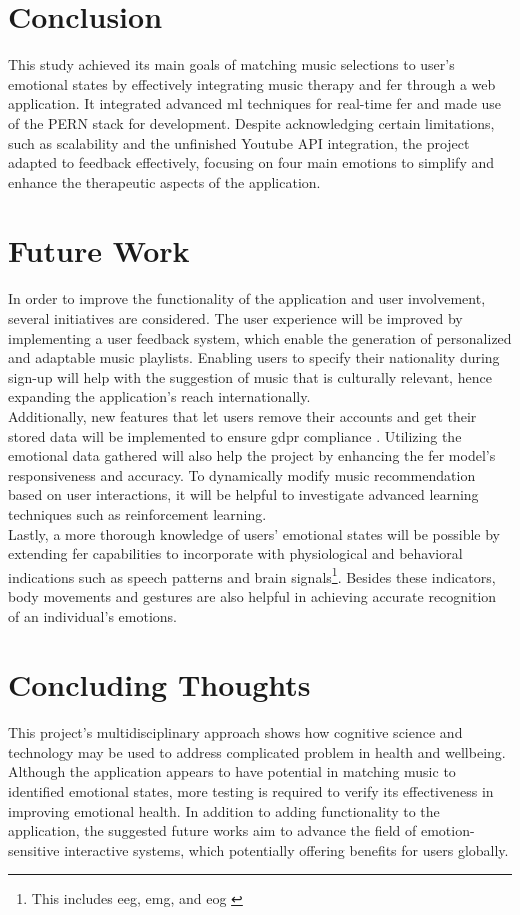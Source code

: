 \section{Conclusion}
This study achieved its main goals of matching music selections to user's emotional states by effectively integrating music therapy and \gls{fer} through a web application.
It integrated advanced \gls{ml} techniques for real-time \gls{fer} and made use of the PERN stack for development.
Despite acknowledging certain limitations, such as scalability and the unfinished Youtube API integration, the project adapted to feedback effectively, focusing on four main emotions to simplify and enhance the therapeutic aspects of the application.
\\
\section{Future Work}
In order to improve the functionality of the application and user involvement, several initiatives are considered.
The user experience will be improved by implementing a user feedback system, which enable the generation of personalized and adaptable music playlists.
Enabling users to specify their nationality during sign-up will help with the suggestion of music that is culturally relevant, hence expanding the application's reach internationally.
\\
\indent Additionally, new features that let users remove their accounts and get their stored data will be implemented to ensure \gls{gdpr} compliance \citep{gdpr_2018_general}.
Utilizing the emotional data gathered will also help the project by enhancing the \gls{fer} model's responsiveness and accuracy.
To dynamically modify music recommendation based on user interactions, it will be helpful to investigate advanced learning techniques such as reinforcement learning.
\\
\indent Lastly, a more thorough knowledge of users' emotional states will be possible by extending \gls{fer} capabilities to incorporate with physiological and behavioral indications such as speech patterns and brain signals\footnote{This includes \gls{eeg}, \gls{emg}, and \gls{eog} \citep{shin_2018_inner}}.
Besides these indicators, body movements and gestures are also helpful in achieving accurate recognition of an individual's emotions.

\section{Concluding Thoughts}
This project's multidisciplinary approach shows how cognitive science and technology  may be used to address complicated problem in health and wellbeing.
Although the application appears to have potential in matching music to identified emotional states, more testing is required to verify its effectiveness in improving emotional health. 
In addition to adding functionality to the application, the suggested future works aim to advance the field of emotion-sensitive interactive systems, which potentially offering benefits for users globally.

